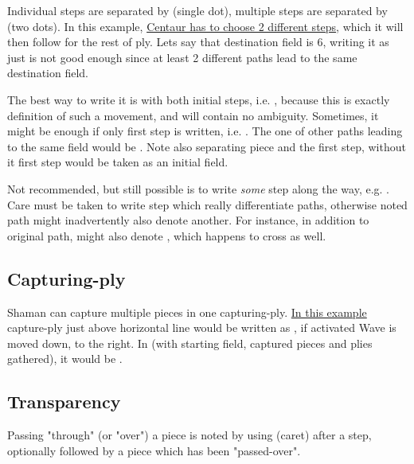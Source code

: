 Individual steps are separated by  (single dot), multiple steps are separated by
 (two dots). In this example,
\hyperref[fig:scn_hd_05_centaur_multi_step]{Centaur has to choose 2 different steps},
which it will then follow for the rest of ply. Lets say that destination field is 6,
writing it as just  is not good enough since at least 2 different paths lead
to the same destination field.

The best way to write it is with both initial steps, i.e. , because
this is exactly definition of such a movement, and will contain no ambiguity. Sometimes,
it might be enough if only first step is written, i.e. . The one of other
paths leading to the same  field would be . Note also 
separating piece and the first step, without it first step would be taken as an initial
field.

Not recommended, but still possible is to write \emph{some} step along the way, e.g.
. Care must be taken to write step which really differentiate paths,
otherwise noted path might inadvertently also denote another. For instance, in addition
to original path,  might also denote , which happens
to cross  as well.

\subsection*{Capturing-ply}
\label{sec:Appendix/Notation/Capturing-ply}

Shaman can capture multiple pieces in one capturing-ply.
\hyperref[fig:scn_cot_03_light_shaman_capture_ply]{In this example} capture-ply just above
horizontal line would be written as , if activated Wave is moved
down, to the right. In  (with starting field, captured pieces and plies gathered),
it would be \alg{[Hd9.h10*P.l11*P.p12]\~{}[Wp12-n8]}.

\subsection*{Transparency}
\label{sec:Appendix/Notation/Transparency}

Passing "through" (or "over") a piece is noted by using \alg{\^{}} (caret) after a step,
optionally followed by a piece which has been "passed-over".

